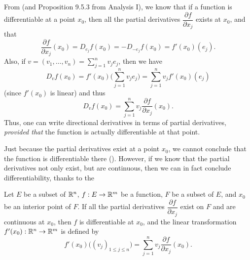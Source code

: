 \begin{ac}\label{ii:ac:6.3.2}
  From  (and Proposition 9.5.3 from Analysis I), we know that if a function is differentiable at a point \(x_0\), then all the partial derivatives \(\dfrac{\partial f}{\partial x_j}\) exists at \(x_0\), and that
  \[
    \dfrac{\partial f}{\partial x_j}(x_0) = D_{e_j} f(x_0) = - D_{-e_j} f(x_0) = f'(x_0)(e_j).
  \]
  Also, if \(v = (v_1, \dots, v_n) = \sum_{j = 1}^n v_j e_j\), then we have
  \[
    D_v f(x_0) = f'(x_0) \bigg(\sum_{j = 1}^n v_j e_j\bigg) = \sum_{j = 1}^n v_j f'(x_0)(e_j)
  \]
  (since \(f'(x_0)\) is linear) and thus
  \[
    D_v f(x_0) = \sum_{j = 1}^n v_j \dfrac{\partial f}{\partial x_j}(x_0).
  \]
  Thus, one can write directional derivatives in terms of partial derivatives, \emph{provided that} the function is actually differentiable at that point.
\end{ac}

\begin{note}
  Just because the partial derivatives exist at a point \(x_0\), we cannot conclude that the function is differentiable there ().
  However, if we know that the partial derivatives not only exist, but are continuous, then we can in fact conclude differentiability, thanks to the 
\end{note}

\begin{thm}\label{ii:6.3.8}
  Let \(E\) be a subset of \(\mathbb{R}^n\), \(f : E \to \mathbb{R}^m\) be a function, \(F\) be a subset of \(E\), and \(x_0\) be an interior point of \(F\).
  If all the partial derivatives \(\dfrac{\partial f}{\partial x_j}\) exist on \(F\) and are continuous at \(x_0\), then \(f\) is differentiable at \(x_0\), and the linear transformation \(f'(x_0) : \mathbb{R}^n \to \mathbb{R}^m\) is defined by
  \[
    f'(x_0)\big((v_j)_{1 \leq j \leq n}\big) = \sum_{j = 1}^n v_j \dfrac{\partial f}{\partial x_j}(x_0).
  \]
\end{thm}


